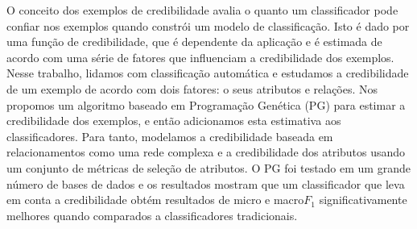 
O conceito dos exemplos de credibilidade avalia o quanto um classificador pode confiar nos exemplos quando constrói um modelo de classificação.
Isto é dado por uma função de credibilidade, que é dependente da aplicação e é estimada de acordo com uma série de fatores que influenciam a credibilidade dos exemplos.
Nesse trabalho, lidamos com classificação automática e estudamos a credibilidade de um exemplo de acordo com dois fatores: o seus atributos e relações.
Nos propomos um algoritmo baseado em Programação Genética (PG) para estimar a credibilidade dos exemplos, e então adicionamos esta estimativa aos classificadores.
Para tanto, modelamos a credibilidade baseada em relacionamentos como uma rede complexa e a credibilidade dos atributos usando um conjunto de métricas de seleção de atributos.
O PG foi testado em um grande número de bases de dados e os resultados mostram que um classificador que leva em conta a credibilidade obtém resultados de micro e macro$F_1$ significativamente melhores quando comparados a classificadores tradicionais.

